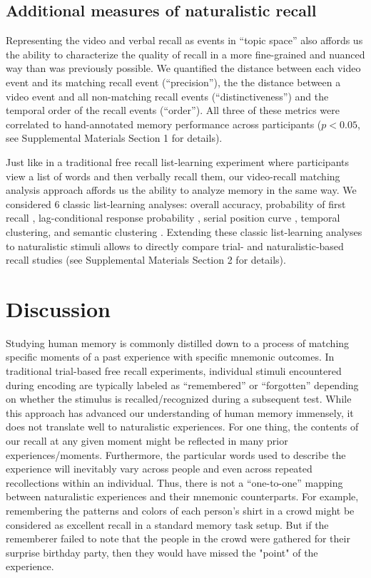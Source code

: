 \documentclass{article}
\begin{document}
\subsection*{Additional measures of naturalistic recall}
Representing the video and verbal recall as events in ``topic space'' also affords us the ability to characterize the quality of recall in a more fine-grained and nuanced way than was previously possible. We quantified the distance between each video event and its matching recall event (``precision''), the the distance between a video event and all non-matching recall events (``distinctiveness'') and the temporal order of the recall events (``order''). All three of these metrics were correlated to hand-annotated memory performance across participants ($p < 0.05$, see Supplemental Materials Section 1 for details).

Just like in a traditional free recall list-learning experiment where participants view a list of words and then verbally recall them, our video-recall matching analysis approach affords us the ability to analyze memory in the same way. We considered 6 classic list-learning analyses: overall accuracy, probability of first recall \citep{Hoga75, HowaKaha99, Lami99}, lag-conditional response probability \citep{Kaha96, HowaKaha99}, serial position curve \citep{Murd62a}, temporal clustering, and semantic clustering \citep{HowaKaha02, PolyEtal09}. Extending these classic list-learning analyses to naturalistic stimuli allows to directly compare trial- and naturalistic-based recall studies (see Supplemental Materials Section 2 for details).

\section*{Discussion}
\label{sec:discussion}
Studying human memory is commonly distilled down to a process of matching specific moments of a past experience with specific mnemonic outcomes.  In traditional trial-based free recall experiments, individual stimuli encountered during encoding are typically labeled as ``remembered'' or ``forgotten'' depending on whether the stimulus is recalled/recognized during a subsequent test. While this approach has advanced our understanding of human memory immensely, it does not translate well to naturalistic experiences. For one thing, the contents of our recall at any given moment might be reflected in many prior experiences/moments. Furthermore, the particular words used to describe the experience will inevitably vary across people and even across repeated recollections within an individual. Thus, there is not a ``one-to-one'' mapping between naturalistic experiences and their mnemonic counterparts. For example, remembering the patterns and colors of each person's shirt in a crowd might be considered as excellent recall in a standard memory task setup. But if the rememberer failed to note that the people in the crowd were gathered for their surprise birthday party, then they would have missed the "point" of the experience.
\end{document}
